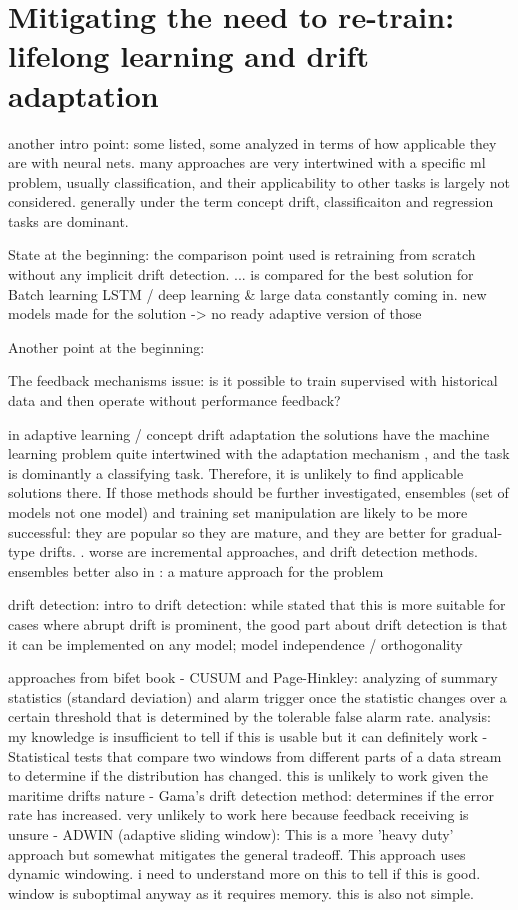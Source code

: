 \section{Mitigating the need to re-train: lifelong learning and drift adaptation}

another intro point: some listed, some analyzed in terms of how applicable they are with neural nets. many approaches are very intertwined with a specific ml problem, usually classification, and their applicability to other tasks is largely not considered. generally under the term concept drift, classificaiton and regression tasks are dominant.

State at the beginning: the comparison point used is retraining from scratch without any implicit drift detection. ... is compared for the best solution for Batch learning LSTM / deep learning
\& large data constantly coming in. new models made for the solution -> no ready adaptive version of those

Another point at the beginning: 

The feedback mechanisms issue: is it possible to train supervised with historical data and then operate without performance feedback?

in adaptive learning / concept drift adaptation the solutions have the machine learning problem quite intertwined with the adaptation mechanism \cite{celik_adaptation_2021}, and the task is dominantly a classifying task. Therefore, it is unlikely to find applicable solutions there. If those methods should be further investigated, ensembles (set of models not one model) and training set manipulation are likely to be more successful: they are popular so they are mature, and they are better for gradual-type drifts. \cite{zliobaite_driftsurvey}. worse are incremental approaches, and drift detection methods.
ensembles better also in  \cite{mlforstreamingsurvey}:
a mature approach for the problem


drift detection:
intro to drift detection: while \cite{zliobaite_driftsurvey} stated that this is more suitable for cases where abrupt drift is prominent, the good part about drift detection is that it can be implemented on any model; model independence / orthogonality

approaches from bifet book
- CUSUM and Page-Hinkley: analyzing of summary statistics (standard deviation) and alarm trigger once the statistic changes over a certain threshold that is determined by the tolerable false alarm rate. analysis: my knowledge is insufficient to tell if this is usable but it can definitely work
- Statistical tests that compare two windows from different parts of a data stream to determine if the distribution has changed. this is unlikely to work given the maritime drifts nature
- Gama's drift detection method: determines if the error rate has increased. very unlikely to work here because feedback receiving is unsure
- ADWIN (adaptive sliding window): This is a more 'heavy duty' approach but somewhat mitigates the general tradeoff. This approach uses dynamic windowing. i need to understand more on this to tell if this is good. window is suboptimal anyway as it requires memory. this is also not simple.



